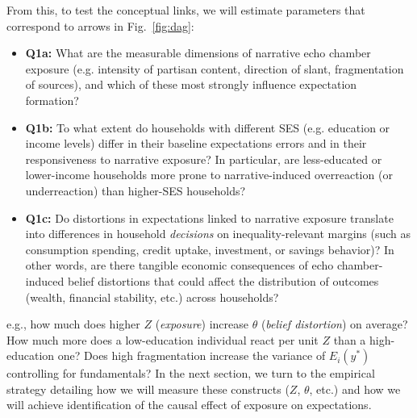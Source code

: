 \documentclass[12pt]{article}
\begin{document}
From this, to test the conceptual links, we will estimate parameters that correspond to arrows in Fig.~\ref{fig:dag}:
\begin{itemize}
    \item \textbf{Q1a:} What are the measurable dimensions of narrative echo chamber exposure (e.g. intensity of partisan content, direction of slant, fragmentation of sources), and which of these most strongly influence expectation formation?
    \item \textbf{Q1b:} To what extent do households with different SES (e.g. education or income levels) differ in their baseline expectations errors and in their responsiveness to narrative exposure? In particular, are less-educated or lower-income households more prone to narrative-induced overreaction (or underreaction) than higher-SES households?
    \item \textbf{Q1c:} Do distortions in expectations linked to narrative exposure translate into differences in household \emph{decisions} on inequality-relevant margins (such as consumption spending, credit uptake, investment, or savings behavior)? In other words, are there tangible economic consequences of echo chamber-induced belief distortions that could affect the distribution of outcomes (wealth, financial stability, etc.) across households?
\end{itemize}

e.g., how much does higher $Z$ (\emph{exposure}) increase $\theta$ (\emph{belief distortion}) on average? How much more does a low-education individual react per unit $Z$ than a high-education one? Does high fragmentation increase the variance of $E_i(y^*)$ controlling for fundamentals?
In the next section, we turn to the empirical strategy detailing how we will measure these constructs ($Z$, $\theta$, etc.) and how we will achieve identification of the causal effect of exposure on expectations.
\end{document}
